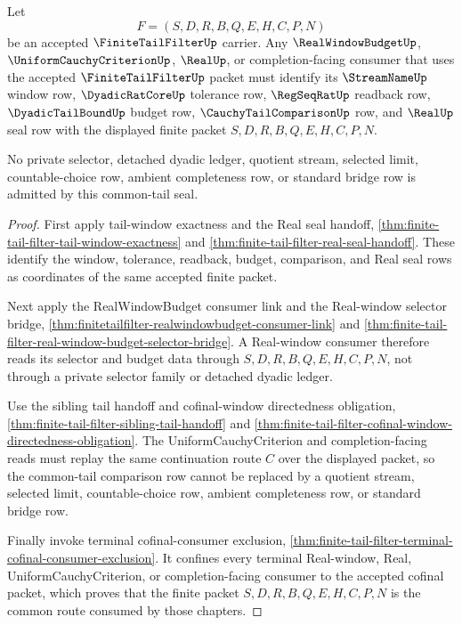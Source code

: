 \begin{theorem}
\label{thm:finite-tail-filter-common-tail-seal-cofinality}
Let
$$
F=(S,D,R,B,Q,E,H,C,P,N)
$$
be an accepted $\FiniteTailFilterUp$ carrier. Any $\RealWindowBudgetUp$, $\UniformCauchyCriterionUp$, $\RealUp$, or completion-facing consumer that uses the accepted $\FiniteTailFilterUp$ packet must identify its $\StreamNameUp$ window row, $\DyadicRatCoreUp$ tolerance row, $\RegSeqRatUp$ readback row, $\DyadicTailBoundUp$ budget row, $\CauchyTailComparisonUp$ row, and $\RealUp$ seal row with the displayed finite packet $S,D,R,B,Q,E,H,C,P,N$.

No private selector, detached dyadic ledger, quotient stream, selected limit, countable-choice row, ambient completeness row, or standard bridge row is admitted by this common-tail seal.
\end{theorem}
\begin{proof}
First apply tail-window exactness and the Real seal handoff, \autoref{thm:finite-tail-filter-tail-window-exactness} and \autoref{thm:finite-tail-filter-real-seal-handoff}. These identify the window, tolerance, readback, budget, comparison, and Real seal rows as coordinates of the same accepted finite packet.

Next apply the RealWindowBudget consumer link and the Real-window selector bridge, \autoref{thm:finitetailfilter-realwindowbudget-consumer-link} and \autoref{thm:finite-tail-filter-real-window-budget-selector-bridge}. A Real-window consumer therefore reads its selector and budget data through $S,D,R,B,Q,E,H,C,P,N$, not through a private selector family or detached dyadic ledger.

Use the sibling tail handoff and cofinal-window directedness obligation, \autoref{thm:finite-tail-filter-sibling-tail-handoff} and \autoref{thm:finite-tail-filter-cofinal-window-directedness-obligation}. The UniformCauchyCriterion and completion-facing reads must replay the same continuation route $C$ over the displayed packet, so the common-tail comparison row cannot be replaced by a quotient stream, selected limit, countable-choice row, ambient completeness row, or standard bridge row.

Finally invoke terminal cofinal-consumer exclusion, \autoref{thm:finite-tail-filter-terminal-cofinal-consumer-exclusion}. It confines every terminal Real-window, Real, UniformCauchyCriterion, or completion-facing consumer to the accepted cofinal packet, which proves that the finite packet $S,D,R,B,Q,E,H,C,P,N$ is the common route consumed by those chapters.
\end{proof}

